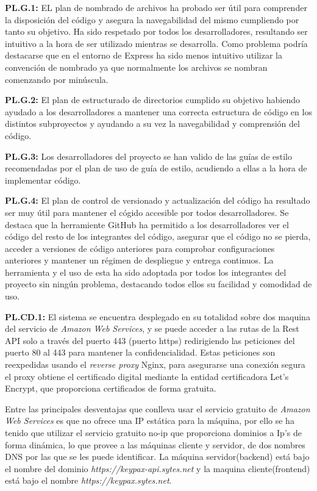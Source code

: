 \documentclass{article}
\begin{document}
\textbf{PL.G.1:} 
EL plan de nombrado de archivos ha probado ser útil para comprender la disposición del código y asegura la navegabilidad del mismo cumpliendo por tanto su objetivo. Ha sido respetado por todos los desarrolladores, resultando ser intuitivo a la hora de ser utilizado mientras se desarrolla. Como problema podría destacarse que en el entorno de Express ha sido menos intuitivo utilizar la convención de nombrado ya que normalmente los archivos se nombran comenzando por minúscula.

\textbf{PL.G.2:} 
El plan de estructurado de directorios cumplido su objetivo habiendo ayudado a los desarrolladores a mantener una correcta estructura de código en los distintos subproyectos y ayudando a su vez la navegabilidad y comprensión del código.

\textbf{PL.G.3:}
Los desarrolladores del proyecto se han valido de las guías de estilo recomendadas por el plan de uso de guía de estilo, acudiendo a ellas a la hora de implementar código.

\textbf{PL.G.4:}
El plan de control de versionado y actualización del código ha resultado ser muy útil para mantener el cógido accesible por todos desarrolladores. Se destaca que la herramiente GitHub ha permitido a los desarrolladores ver el código del resto de los integrantes del código, asegurar que el código no se pierda, acceder a versiones de código anteriores para comprobar configuraciones anteriores y mantener un régimen de despliegue y entrega continuos. La herramienta y el uso de esta ha sido adoptada por todos los integrantes del proyecto sin ningún problema, destacando todos ellos su facilidad y comodidad de uso.

\textbf{PL.CD.1:}
El sistema se encuentra desplegado en su totalidad sobre dos maquina del servicio de \textit{Amazon Web Services}, y se puede acceder a las rutas de la Rest API solo a través del puerto 443 (puerto https) redirigiendo las peticiones del puerto 80 al 443 para mantener la confidencialidad. Estas peticiones son reexpedidas usando el \textit{reverse proxy} Nginx, para asegurarse una conexión segura el proxy obtiene el certificado digital mediante la entidad certificadora Let's Encrypt, que proporciona certificados de forma gratuita.
 
Entre las principales desventajas que conlleva usar el servicio gratuito de \textit{Amazon Web Services} es que no ofrece una IP estática para la máquina, por ello se ha tenido que utilizar el servicio gratuito no-ip que proporciona dominios a Ip's de forma dinámica, lo que provee a las máquinas cliente y servidor, de dos nombres DNS por las que se les puede identificar. La máquina servidor(backend) está bajo el nombre del dominio \textit{https://keypax-api.sytes.net} y la maquina cliente(frontend) está bajo el nombre \textit{https://keypax.sytes.net}.
\end{document}
